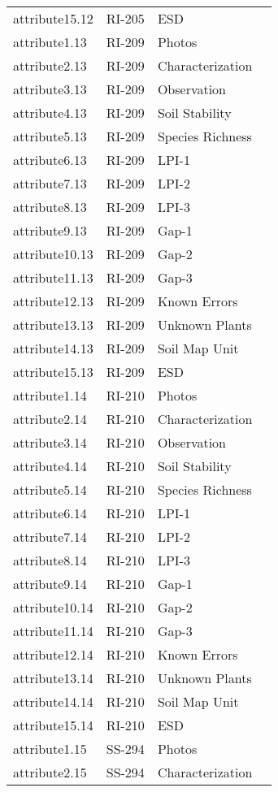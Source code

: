 \documentclass[
]{article}
\begin{document}
\begin{longtable}[]{@{}llll@{}}
attribute15.12 & RI-205 & ESD & \\
attribute1.13 & RI-209 & Photos & \\
attribute2.13 & RI-209 & Characterization & \\
attribute3.13 & RI-209 & Observation & \\
attribute4.13 & RI-209 & Soil Stability & \\
attribute5.13 & RI-209 & Species Richness & \\
attribute6.13 & RI-209 & LPI-1 & \\
attribute7.13 & RI-209 & LPI-2 & \\
attribute8.13 & RI-209 & LPI-3 & \\
attribute9.13 & RI-209 & Gap-1 & \\
attribute10.13 & RI-209 & Gap-2 & \\
attribute11.13 & RI-209 & Gap-3 & \\
attribute12.13 & RI-209 & Known Errors & \\
attribute13.13 & RI-209 & Unknown Plants & \\
attribute14.13 & RI-209 & Soil Map Unit & \\
attribute15.13 & RI-209 & ESD & \\
attribute1.14 & RI-210 & Photos & \\
attribute2.14 & RI-210 & Characterization & \\
attribute3.14 & RI-210 & Observation & \\
attribute4.14 & RI-210 & Soil Stability & \\
attribute5.14 & RI-210 & Species Richness & \\
attribute6.14 & RI-210 & LPI-1 & \\
attribute7.14 & RI-210 & LPI-2 & \\
attribute8.14 & RI-210 & LPI-3 & \\
attribute9.14 & RI-210 & Gap-1 & \\
attribute10.14 & RI-210 & Gap-2 & \\
attribute11.14 & RI-210 & Gap-3 & \\
attribute12.14 & RI-210 & Known Errors & \\
attribute13.14 & RI-210 & Unknown Plants & \\
attribute14.14 & RI-210 & Soil Map Unit & \\
attribute15.14 & RI-210 & ESD & \\
attribute1.15 & SS-294 & Photos & \\
attribute2.15 & SS-294 & Characterization & \\

\end{longtable}
\end{document}
